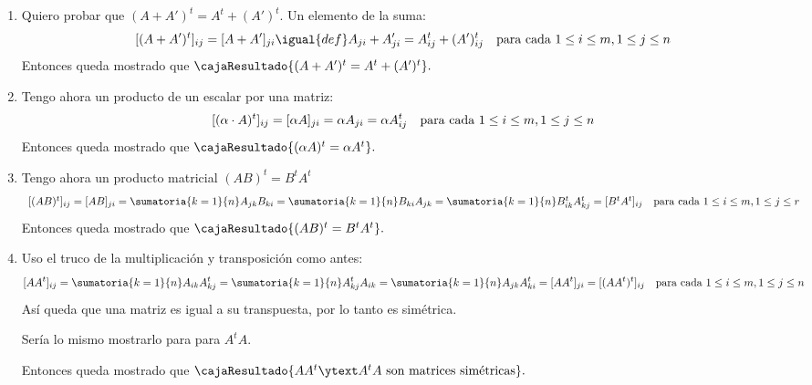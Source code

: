 \begin{enumerate}[label=(\alph*)]
  \item  Quiero probar que $(A + A')^t = A^t + (A')^t$. Un elemento de la suma:
        $$
          [(A + A')^t]_{ij}
            =
            [A + A']_{ji} \igual{def} A_{ji} + A'_{ji}
          =
          A^t_{ij} + (A')^t_{ij}
          \text{\quad para cada } 1 \leq i \leq m, 1 \leq j \leq n
        $$
        Entonces queda mostrado que
        $
          \cajaResultado{
            (A + A')^t = A^t + (A')^t
          }.
        $

  \item Tengo ahora un producto de un escalar por una matriz:
        $$
          [(\alpha \cdot A)^t]_{ij}
            = [\alpha A]_{ji}
          = \alpha A_{ji}
          = \alpha A^t_{ij}
          \text{\quad para cada } 1 \leq i \leq m, 1 \leq j \leq n
        $$
        Entonces queda mostrado que
        $
          \cajaResultado{
            (\alpha A)^t = \alpha A^t
          }.
        $

  \item Tengo ahora un producto matricial $(AB)^t = B^tA^t$
        $$
          \begin{array}{c}
            [(AB)^t]_{ij}
              =
              [AB]_{ji} =
            \sumatoria{k = 1}{n} A_{jk} B_{ki} =
            \sumatoria{k = 1}{n} B_{ki} A_{jk} =
            \sumatoria{k = 1}{n} B^t_{ik} A^t_{kj} =
              [B^t A^t]_{ij}
            \text{\quad para cada } 1 \leq i \leq m, 1 \leq j \leq r
          \end{array}
        $$
        Entonces queda mostrado que
        $
          \cajaResultado{
            (AB)^t = B^t A^t
          }.
        $

  \item Uso el truco de la multiplicación y transposición como antes:
        $$
          [A A^t]_{ij} =
          \sumatoria{k = 1}{n} A_{ik} A^t_{kj} =
          \sumatoria{k = 1}{n}  A^t_{kj} A_{ik}=
          \sumatoria{k = 1}{n}  A_{jk} A^t_{ki} =
          [A A^t]_{ji} =
            [(A A^t)^t]_{ij}
          \text{\quad para cada } 1 \leq i \leq m, 1 \leq j \leq n
        $$
        Así queda que una matriz es igual a su transpuesta, por lo tanto
        es simétrica.

        Sería lo mismo mostrarlo para para $A^tA$.

        Entonces queda mostrado que
        $
          \cajaResultado{
            AA^t \ytext A^tA
            \text{ son matrices simétricas}}.
        $


\end{enumerate}
